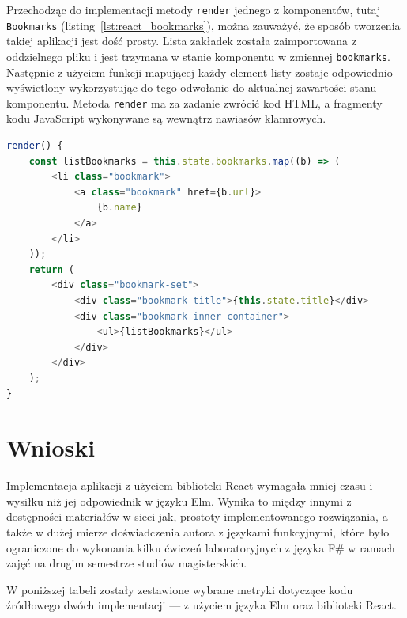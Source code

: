 \documentclass[twoside,a4paper]{report}
\begin{document}
Przechodząc do implementacji metody \texttt{render{}} jednego z komponentów, tutaj \texttt{Bookmarks} (listing~\ref{lst:react_bookmarks}), można zauważyć, że sposób tworzenia takiej aplikacji jest dość prosty.
Lista zakładek została zaimportowana z oddzielnego pliku i jest trzymana w stanie komponentu w zmiennej \texttt{bookmarks}.
Następnie z użyciem funkcji mapującej każdy element listy zostaje odpowiednio wyświetlony wykorzystując do tego odwołanie do aktualnej zawartości stanu komponentu.
Metoda \texttt{render} ma za zadanie zwrócić kod HTML, a fragmenty kodu JavaScript wykonywane są wewnątrz nawiasów klamrowych.

\begin{lstlisting}[caption={Metoda \texttt{render()} komponentu \texttt{Bookmarks}},label={lst:react_bookmarks},language={JavaScript}]
render() {
    const listBookmarks = this.state.bookmarks.map((b) => (
        <li class="bookmark">
            <a class="bookmark" href={b.url}>
                {b.name}
            </a>
        </li>
    ));
    return (
        <div class="bookmark-set">
            <div class="bookmark-title">{this.state.title}</div>
            <div class="bookmark-inner-container">
                <ul>{listBookmarks}</ul>
            </div>
        </div>
    );
}
\end{lstlisting}

\section{Wnioski}
Implementacja aplikacji z użyciem biblioteki React wymagała mniej czasu i wysiłku niż jej odpowiednik w języku Elm.
Wynika to między innymi z dostępności materiałów w sieci jak, prostoty implementowanego rozwiązania, a także w dużej mierze doświadczenia autora z językami funkcyjnymi, które było ograniczone do wykonania kilku ćwiczeń laboratoryjnych z języka F\# w ramach zajęć na drugim semestrze studiów magisterskich.

W poniższej tabeli zostały zestawione wybrane metryki dotyczące kodu źródłowego dwóch implementacji --- z użyciem języka Elm oraz biblioteki React.
\end{document}
